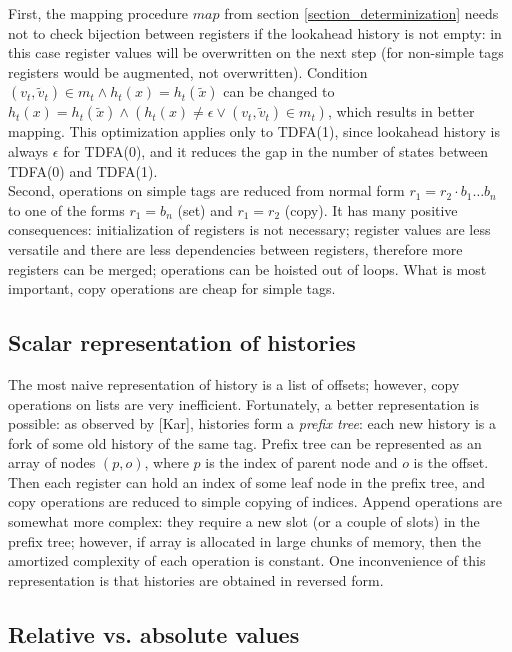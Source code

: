 \documentclass{article}
\newcommand{\Xin}{\!\in\!}
\newcommand{\Xeq}{\!=\!}
\theoremstyle{definition}
\begin{document}
\begin{multicols}{2}
First, the mapping procedure $map$ from section \ref{section_determinization}
needs not to check bijection between registers if the lookahead history is not empty:
in this case register values will be overwritten on the next step
(for non-simple tags registers would be augmented, not overwritten).
Condition $(v_t, \widetilde{v}_t) \Xin m_t \wedge h_t(x) \Xeq h_t(\widetilde{x})$
can be changed to $h_t(x) \Xeq h_t(\widetilde{x}) \wedge (h_t(x) \!\neq\! \epsilon \vee (v_t, \widetilde{v}_t) \Xin m_t)$,
which results in better mapping.
This optimization applies only to TDFA(1), since lookahead history is always $\epsilon$ for TDFA(0),
and it reduces the gap in the number of states between TDFA(0) and TDFA(1).
\\

Second, operations on simple tags are reduced from normal form $r_1 \Xeq r_2 \cdot b_1 \dots b_n$
to one of the forms $r_1 \Xeq b_n$ (set) and $r_1 \Xeq r_2$ (copy).
It has many positive consequences:
initialization of registers is not necessary;
register values are less versatile and there are less dependencies between registers, therefore more registers can be merged;
operations can be hoisted out of loops.
What is most important, copy operations are cheap for simple tags.

\subsection*{Scalar representation of histories}

The most naive representation of history is a list of offsets;
however, copy operations on lists are very inefficient.
Fortunately, a better representation is possible: as observed by [Kar], histories form a \emph{prefix tree}:
each new history is a fork of some old history of the same tag.
Prefix tree can be represented as an array of nodes $(p, o)$,
where $p$ is the index of parent node and $o$ is the offset.
Then each register can hold an index of some leaf node in the prefix tree,
and copy operations are reduced to simple copying of indices.
Append operations are somewhat more complex: they require a new slot (or a couple of slots) in the prefix tree;
however, if array is allocated in large chunks of memory,
then the amortized complexity of each operation is constant.
One inconvenience of this representation is that histories are obtained in reversed form.

\subsection*{Relative vs. absolute values}


\end{multicols}
\end{document}
